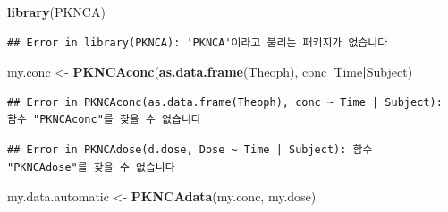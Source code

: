 \documentclass[12pt,]{krantz}
\newenvironment{Shaded}{\begin{snugshade}}{\end{snugshade}}
\newcommand{\DecValTok}[1]{\textcolor[rgb]{0.00,0.00,0.81}{#1}}
\newcommand{\KeywordTok}[1]{\textcolor[rgb]{0.13,0.29,0.53}{\textbf{#1}}}
\newcommand{\NormalTok}[1]{#1}
\newcommand{\OperatorTok}[1]{\textcolor[rgb]{0.81,0.36,0.00}{\textbf{#1}}}
\newcommand{\StringTok}[1]{\textcolor[rgb]{0.31,0.60,0.02}{#1}}
\begin{document}
\begin{Shaded}
\begin{Highlighting}[]
\KeywordTok{library}\NormalTok{(PKNCA)}
\end{Highlighting}
\end{Shaded}

\begin{verbatim}
## Error in library(PKNCA): 'PKNCA'이라고 불리는 패키지가 없습니다
\end{verbatim}

\begin{Shaded}
\begin{Highlighting}[]
\NormalTok{my.conc <-}\StringTok{ }\KeywordTok{PKNCAconc}\NormalTok{(}\KeywordTok{as.data.frame}\NormalTok{(Theoph), conc}\OperatorTok{~}\NormalTok{Time}\OperatorTok{|}\NormalTok{Subject)}
\end{Highlighting}
\end{Shaded}

\begin{verbatim}
## Error in PKNCAconc(as.data.frame(Theoph), conc ~ Time | Subject): 함수 "PKNCAconc"를 찾을 수 없습니다
\end{verbatim}

\begin{Shaded}
\end{Shaded}

\begin{verbatim}
## Error in PKNCAdose(d.dose, Dose ~ Time | Subject): 함수 "PKNCAdose"를 찾을 수 없습니다
\end{verbatim}

\begin{Shaded}
\begin{Highlighting}[]
\NormalTok{my.data.automatic <-}\StringTok{ }\KeywordTok{PKNCAdata}\NormalTok{(my.conc, my.dose)}
\end{Highlighting}
\end{Shaded}
\end{document}
